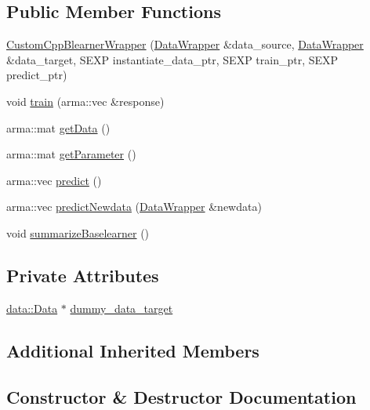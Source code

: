 \subsection*{Public Member Functions}
\begin{DoxyCompactItemize}
\item 
\mbox{\hyperlink{class_custom_cpp_blearner_wrapper_af5083cc4ff105d0818b7443f228d09ab}{Custom\+Cpp\+Blearner\+Wrapper}} (\mbox{\hyperlink{class_data_wrapper}{Data\+Wrapper}} \&data\+\_\+source, \mbox{\hyperlink{class_data_wrapper}{Data\+Wrapper}} \&data\+\_\+target, S\+E\+XP instantiate\+\_\+data\+\_\+ptr, S\+E\+XP train\+\_\+ptr, S\+E\+XP predict\+\_\+ptr)
\item 
void \mbox{\hyperlink{class_custom_cpp_blearner_wrapper_a84d08ce4754955b5d6ee2e4a66b5b6bc}{train}} (arma\+::vec \&response)
\item 
arma\+::mat \mbox{\hyperlink{class_custom_cpp_blearner_wrapper_a015410ca4260c3e5586ab7923ef2d624}{get\+Data}} ()
\item 
arma\+::mat \mbox{\hyperlink{class_custom_cpp_blearner_wrapper_a604cbaa8f8fe0bc5fda3a9baad13f646}{get\+Parameter}} ()
\item 
arma\+::vec \mbox{\hyperlink{class_custom_cpp_blearner_wrapper_adc2c36f510b88052f2fd599b3e737ee2}{predict}} ()
\item 
arma\+::vec \mbox{\hyperlink{class_custom_cpp_blearner_wrapper_abc89ab2789f72dad6eccdcdfa01ecbc4}{predict\+Newdata}} (\mbox{\hyperlink{class_data_wrapper}{Data\+Wrapper}} \&newdata)
\item 
void \mbox{\hyperlink{class_custom_cpp_blearner_wrapper_a832effb3868e124cb149fd06e6033304}{summarize\+Baselearner}} ()
\end{DoxyCompactItemize}
\subsection*{Private Attributes}
\begin{DoxyCompactItemize}
\item 
\mbox{\hyperlink{classdata_1_1_data}{data\+::\+Data}} $\ast$ \mbox{\hyperlink{class_custom_cpp_blearner_wrapper_aa7cf022cc61378629f25ba1727c81fe1}{dummy\+\_\+data\+\_\+target}}
\end{DoxyCompactItemize}
\subsection*{Additional Inherited Members}


\subsection{Constructor \& Destructor Documentation}
\mbox{\label{class_custom_cpp_blearner_wrapper_af5083cc4ff105d0818b7443f228d09ab}} 

